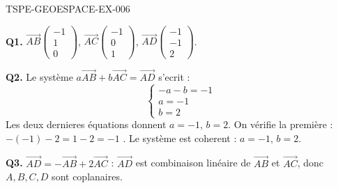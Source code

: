 \begin{corrige}{TSPE-GEOESPACE-EX-006}

\textbf{Q1.} $\vec{AB}\begin{pmatrix}-1\\1\\0\end{pmatrix}$, $\vec{AC}\begin{pmatrix}-1\\0\\1\end{pmatrix}$, $\vec{AD}\begin{pmatrix}-1\\-1\\2\end{pmatrix}$.

\textbf{Q2.} Le système $a\vec{AB}+b\vec{AC}=\vec{AD}$ s'ecrit :
\[
  \begin{cases} -a-b = -1 \\ a = -1 \\ b = 2 \end{cases}
\]
Les deux dernieres équations donnent $a=-1$, $b=2$. On vérifie la première : $-(-1)-2 = 1-2=-1$ \checkmark. Le système est coherent : $a=-1$, $b=2$.

\textbf{Q3.} $\vec{AD} = -\vec{AB}+2\vec{AC}$ : $\vec{AD}$ est combinaison linéaire de $\vec{AB}$ et $\vec{AC}$, donc $A,B,C,D$ sont coplanaires.

\end{corrige}
